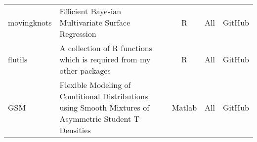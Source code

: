 \documentclass[twoside,a4paper]{article}
\begin{document}
\begin{tabular}{lp{9cm}ccl}
movingknots & Efficient Bayesian Multivariate Surface Regression                                                                   & R        & All         & GitHub       \\
flutils     & A collection of R functions which is required from my other packages                                                 & R        & All         & GitHub       \\
GSM         & Flexible Modeling of Conditional Distributions using Smooth Mixtures of Asymmetric Student T Densities               & Matlab   & All         & GitHub       \\
  \bottomrule
\end{tabular}

\end{document}
